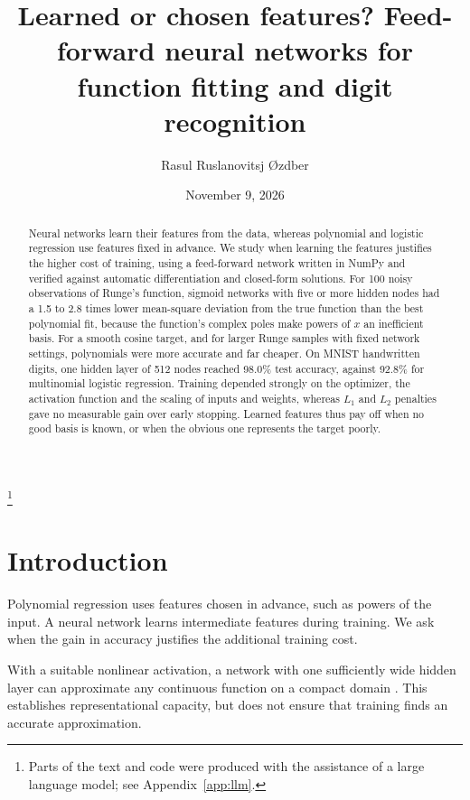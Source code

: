 \documentclass[aps,prb,reprint,superscriptaddress,nofootinbib,longbibliography,floatfix]{revtex4-2}
\begin{document}
\title{Learned or chosen features? Feed-forward neural networks for function fitting and digit recognition}

\author{Rasul Ruslanovitsj {\O}zdber}
\thanks{Parts of the text and code were produced with the assistance of a large language model; see Appendix~\protect\ref{app:llm}.}

\date{November 9, 2026}

\begin{abstract}
Neural networks learn their features from the data, whereas polynomial and logistic regression use features fixed in advance. We study when learning the features justifies the higher cost of training, using a feed-forward network written in NumPy and verified against automatic differentiation and closed-form solutions. For 100 noisy observations of Runge's function, sigmoid networks with five or more hidden nodes had a 1.5 to 2.8 times lower mean-square deviation from the true function than the best polynomial fit, because the function's complex poles make powers of $x$ an inefficient basis. For a smooth cosine target, and for larger Runge samples with fixed network settings, polynomials were more accurate and far cheaper. On MNIST handwritten digits, one hidden layer of 512 nodes reached 98.0\% test accuracy, against 92.8\% for multinomial logistic regression. Training depended strongly on the optimizer, the activation function and the scaling of inputs and weights, whereas $L_1$ and $L_2$ penalties gave no measurable gain over early stopping. Learned features thus pay off when no good basis is known, or when the obvious one represents the target poorly.
\end{abstract}

\maketitle

\section{Introduction}\label{sec:intro}

Polynomial regression uses features chosen in advance, such as powers of the input. A neural network learns intermediate features during training. We ask when the gain in accuracy justifies the additional training cost.

With a suitable nonlinear activation, a network with one sufficiently wide hidden layer can approximate any continuous function on a compact domain \cite[Sec.~8.4]{HjorthJensen2026}. This establishes representational capacity, but does not ensure that training finds an accurate approximation.
\end{document}
